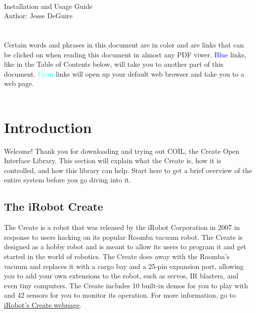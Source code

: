 \documentclass {article}
\begin{document}
 \\
{\large {Installation and Usage Guide}} \\
Author: Jesse DeGuire \\
\\
\\
Certain words and phrases in this document are in color and are links that can be clicked on when
reading this document in almost any PDF viwer.  \textcolor{blue}{Blue} links, like in the Table of
Contents below, will take you to another part of this document.  \textcolor{cyan}{Cyan} links will
open up your default web browser and take you to a web page. \\
\\

\tableofcontents
\newpage


\section {Introduction}
Welcome!  Thank you for downloading and trying out COIL, the Create Open Interface Library.  This
section will explain what the Create is, how it is controlled, and how this library can help.  Start
here to get a brief overview of the entire system before you go diving into it.

\subsection {The iRobot Create}
The Create is a robot that was released by the iRobot Corporation in 2007 in response to users
hacking on its popular Roomba vacuum robot.  The Create is designed as a hobby robot and is meant to
allow its users to program it and get started in the world of robotics.  The Create does away with
the Roomba's vacuum and replaces it with a cargo bay and a 25-pin expansion port, allowing you to
add your own extensions to the robot, such as servos, IR blasters, and even tiny computers.  The
Create includes 10 built-in demos for you to play with and 42 sensors for you to monitor its
operation.  For more information, go to \href{http://www.irobot.com/sp.cfm?pageid=305}{iRobot's
  Create webpage}.
\end{document}
